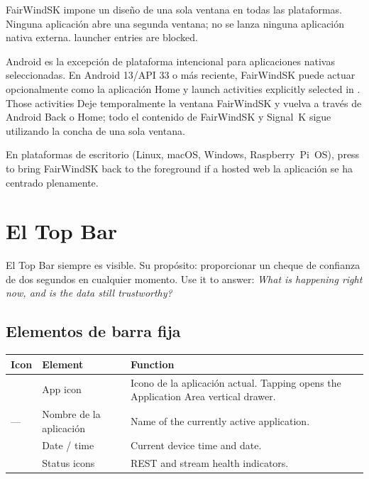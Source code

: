 FairWindSK impone un diseño de una sola ventana en todas las plataformas.
Ninguna aplicación abre una segunda ventana; no se lanza ninguna aplicación nativa externa.
 launcher entries are blocked.

Android es la excepción de plataforma intencional para aplicaciones nativas seleccionadas.
En Android 13/API 33 o más reciente, FairWindSK puede actuar opcionalmente como la aplicación Home y
launch activities explicitly selected in . Those activities
Deje temporalmente la ventana FairWindSK y vuelva a través de Android Back o Home;
todo el contenido de FairWindSK y Signal~K sigue utilizando la concha de una sola ventana.

En plataformas de escritorio (Linux, macOS, Windows, Raspberry~Pi~OS),
press  to bring FairWindSK back to the foreground if a hosted web
la aplicación se ha centrado plenamente.

\chapter{El Top Bar}
\label{ch:topbar}

El Top Bar siempre es visible.
Su propósito: proporcionar un cheque de confianza de dos segundos en cualquier momento.
Use it to answer: \textit{What is happening right now, and is the data still
trustworthy?}


\section{Elementos de barra fija}

\begin{longtable}{C{1.5cm}L{2.8cm}L{9.4cm}}
\toprule
{}
\color{white}\sffamily\bfseries Icon &
\color{white}\sffamily\bfseries Element &
\color{white}\sffamily\bfseries Function \\
\midrule
{}       & App icon    &
Icono de la aplicación actual.
  Tapping opens the Application Area vertical drawer. \\
---                     &Nombre de la aplicación&
  Name of the currently active application. \\
     & Date / time &
  Current device time and date. \\
& Status icons &
  REST and stream health indicators. \\
\bottomrule
\end{longtable}

